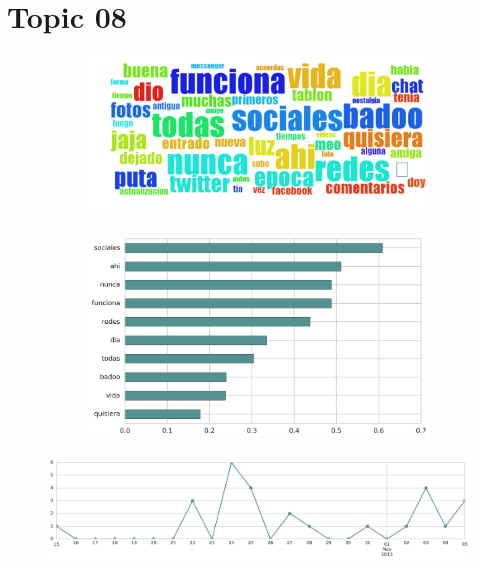 \section{Topic 08}

\begin{figure}[htbp!]
    \centering
    \begin{subfigure}[b]{0.49\textwidth}
        \includegraphics[width=\textwidth]{twitter_murcia/report_images/topic-08-wordcloud.jpg}
    \end{subfigure}
    \begin{subfigure}[b]{0.49\textwidth}
        \includegraphics[width=\textwidth]{twitter_murcia/report_images/topic-08-terms.jpg}
    \end{subfigure}
\end{figure}

\begin{figure}[htbp!]
    \centering
    \includegraphics[width=\textwidth]{twitter_murcia/report_images/topic-08-timeseries.jpg}
\end{figure}

